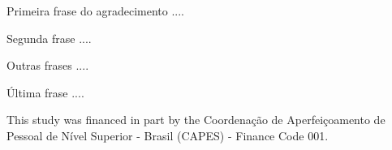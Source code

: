 \begin{agradecimentos}
	Primeira frase do agradecimento ....
	
	Segunda frase ....
	
	Outras frases ....
	
	Última frase ....

	This study was financed in part by the Coordenação de Aperfeiçoamento de Pessoal de Nível Superior - Brasil (CAPES) - Finance Code 001.
	
\end{agradecimentos}
